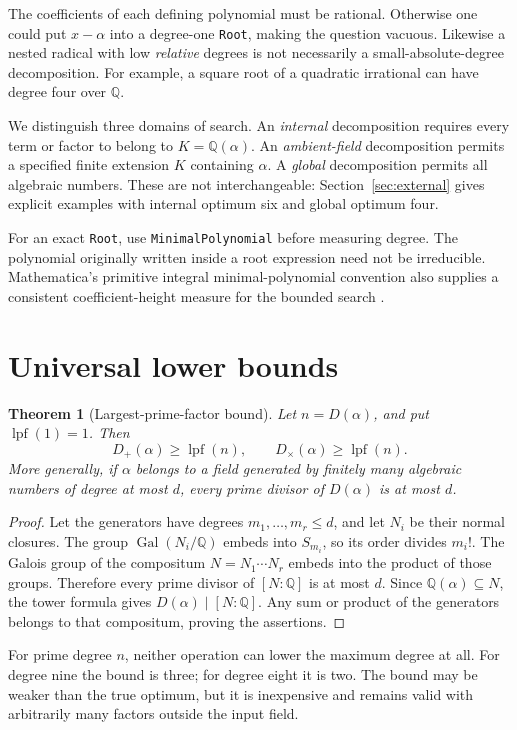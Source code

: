 \documentclass[11pt,letterpaper]{article}
\newtheorem{theorem}{Theorem}[section]
\theoremstyle{definition}
\theoremstyle{remark}
\newcommand{\Q}{\mathbb Q}
\newcommand{\Gal}{\operatorname{Gal}}
\newcommand{\lpf}{\operatorname{lpf}}
\newcommand{\Dplus}{D_{+}}
\newcommand{\Dtimes}{D_{\times}}
\newcommand{\wl}[1]{\texttt{#1}}
\begin{document}
The coefficients of each defining polynomial must be rational. Otherwise
one could put \(x-\alpha\) into a degree-one \wl{Root}, making the question
vacuous. Likewise a nested radical with low \emph{relative} degrees is not
necessarily a small-absolute-degree decomposition. For example, a square
root of a quadratic irrational can have degree four over \(\Q\).

We distinguish three domains of search. An \emph{internal} decomposition
requires every term or factor to belong to \(K=\Q(\alpha)\). An
\emph{ambient-field} decomposition permits a specified finite extension
\(K\) containing \(\alpha\). A \emph{global} decomposition permits all
algebraic numbers. These are not interchangeable: Section~\ref{sec:external}
gives explicit examples with internal optimum six and global optimum four.

For an exact \wl{Root}, use \wl{MinimalPolynomial} before measuring degree.
The polynomial originally written inside a root expression need not be
irreducible. Mathematica's primitive integral minimal-polynomial convention
also supplies a consistent coefficient-height measure for the bounded
search \cite{minpoly}.

\section{Universal lower bounds}\label{sec:bounds}
\begin{theorem}[Largest-prime-factor bound]\label{thm:lpf}
Let \(n=D(\alpha)\), and put \(\lpf(1)=1\). Then
\[
 \Dplus(\alpha)\geq\lpf(n),\qquad
 \Dtimes(\alpha)\geq\lpf(n).
\]
More generally, if \(\alpha\) belongs to a field generated by finitely many
algebraic numbers of degree at most \(d\), every prime divisor of
\(D(\alpha)\) is at most \(d\).
\end{theorem}
\begin{proof}
Let the generators have degrees \(m_1,\ldots,m_r\leq d\), and let \(N_i\)
be their normal closures. The group \(\Gal(N_i/\Q)\) embeds into
\(S_{m_i}\), so its order divides \(m_i!\). The Galois group of the
compositum \(N=N_1\cdots N_r\) embeds into the product of those groups.
Therefore every prime divisor of \([N:\Q]\) is at most \(d\).
Since \(\Q(\alpha)\subseteq N\), the tower formula gives
\(D(\alpha)\mid[N:\Q]\). Any sum or product of the generators belongs
to that compositum, proving the assertions.
\end{proof}
For prime degree \(n\), neither operation can lower the maximum degree at
all. For degree nine the bound is three; for degree eight it is two. The
bound may be weaker than the true optimum, but it is inexpensive and remains
valid with arbitrarily many factors outside the input field.
\end{document}

